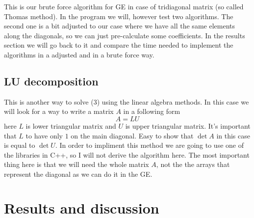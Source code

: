 \documentclass[10pt]{article}
\begin{document}
This is our brute force algorithm for GE in case of tridiagonal matrix (so called Thomas method). In the program we will, however test two algorithms. The second one is a bit adjusted to our case where we have all the same elements along the diagonals, so we can just pre-calculate some coefficients. In the results section we will go back to it and compare the time needed to implement the algorithms in a adjusted and in a brute force way.
\subsection{LU decomposition}
This is another way to solve (3) using the linear algebra methods. In this case we will look for a way to write a matrix $ A $ in a following form
\begin{equation}
A=LU
\end{equation}
here $ L $ is lower triangular matrix and $ U $ is upper triangular matrix. It's important that $ L $ to have only $ 1 $ on the main diagonal. Easy to show that $ \det A $ in this case is equal to $ \det U $. In order to impliment this method we are going to use one of the libraries in C++, so I will not derive the algorithm here. The most important thing here is that we will need the whole matrix $ A $, not the the arrays that represent the diagonal as we can do it in the GE.

\section{Results and discussion}
\end{document}
